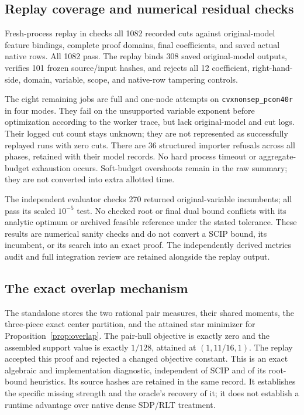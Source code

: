 \subsection{Replay coverage and numerical residual checks}

Fresh-process replay in
checks all 1082 recorded cuts against original-model feature bindings,
complete proof domains, final coefficients, and saved actual native
rows. All 1082 pass. The replay binds 308 saved original-model
outputs, verifies 101 frozen source/input hashes, and rejects all
12 coefficient, right-hand-side, domain, variable, scope, and native-row
tampering controls.

The eight remaining jobs are full and one-node attempts on
\texttt{cvxnonsep\_pcon40r} in four modes. They fail on the unsupported
variable exponent before optimization according to the worker trace,
but lack original-model and cut logs. Their logged cut count stays
unknown; they are not represented as successfully replayed runs with
zero cuts. There are 36 structured importer refusals across all
phases, retained with their model records. No hard process timeout or
aggregate-budget exhaustion occurs. Soft-budget overshoots remain
in the raw summary; they are not converted into extra allotted time.

The independent evaluator checks 270 returned original-variable
incumbents; all pass its scaled $10^{-5}$ test. No checked root or
final dual bound conflicts with its analytic optimum or archived
feasible reference under the stated tolerance. These results are
numerical sanity checks and do not convert a SCIP bound, its
incumbent, or its search into an exact proof. The independently
derived metrics audit and full integration review are retained
alongside the replay output.

\subsection{The exact overlap mechanism}

The standalone
stores the two rational pair measures, their shared moments, the
three-piece exact center partition, and the attained star minimizer
for Proposition~\ref{prop:overlap}. The pair-hull objective is exactly
zero and the assembled support value is exactly $1/128$, attained
at $(1,11/16,1)$. The replay accepted this proof and rejected a changed
objective constant. This is an exact algebraic and implementation
diagnostic, independent of SCIP and of its root-bound heuristics.
Its source hashes are retained in the same record. It establishes the
specific missing strength and the oracle's recovery of it; it does
not establish a runtime advantage over native dense SDP/RLT treatment.

